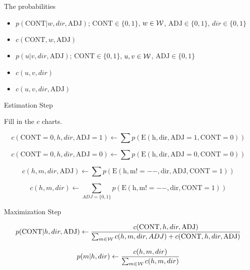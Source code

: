 \documentclass{article}
\begin{document}
The probabilities 

\begin{itemize}
\item $p(\mathrm{CONT} | w, dir, \mathrm{ADJ})$; $\mathrm{CONT} \in \{0, 1\}$,  $w \in {\cal W}$, $\mathrm{ADJ} \in \{0, 1\}$, $dir \in \{0,1\}$
\item $c(\mathrm{CONT}, w, \mathrm{ADJ})$
\item $p(u | v, dir, \mathrm{ADJ})$; $\mathrm{CONT} \in \{0, 1\}$,  $u, v \in {\cal W}$, $\mathrm{ADJ} \in \{0, 1\}$
\item $c(u, v, dir)$
\item $c(u, v, dir, \mathrm{ADJ})$

\end{itemize}



Estimation Step


Fill in the $c$ charts. 



 \[c(\mathrm{CONT} = 0, h, dir, \mathrm{ADJ}= 1) \gets 
  \sum p(\mathrm{E(h, dir, ADJ=1, CONT = 0)}) \]

 \[c(\mathrm{CONT} = 0, h, dir, \mathrm{ADJ}= 0) \gets 
  \sum p(\mathrm{E(h, dir, ADJ=0, CONT = 0)}) \]

\[c(h, m, dir, \mathrm{ADJ}) \gets   \sum p(\mathrm{E(h, m!=--, dir, ADJ, CONT = 1)}) \]

\[c(h, m, dir) \gets   \sum\limits_{ADJ=\{0,1\}} p(\mathrm{E(h, m!=--, dir, CONT = 1)}) \]


Maximization Step

  \[p(\mathrm{CONT} | h, dir, \mathrm{ADJ}) \gets 
  \frac{c(\mathrm{CONT}, h, dir, \mathrm{ADJ})}{
    \sum_{m \in {\cal W}} c(h, m, dir, ADJ) + c(\mathrm{CONT}, h, dir, \mathrm{ADJ})} 
  \]



  \[p(m | h, dir) \gets 
  \frac{c(h, m, dir)}{
    \sum_{m \in {\cal W}} c(h, m, dir)}
  \]
\end{document}
